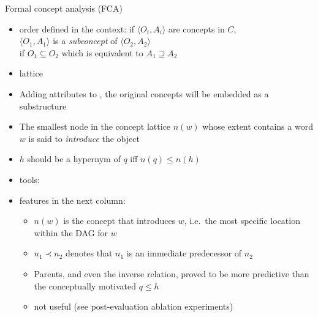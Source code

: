 \documentclass{beamer}
\newlength{\onecolwid}
\begin{document}
\begin{frame}[t]
\begin{columns}[t]
\begin{column}{\onecolwid}
\begin{block}{Formal concept analysis (FCA)}
\begin{itemize}
          \item order defined in the context:
            if $\langle O_i , A_i \rangle$ are concepts in $C$, \\
            $\langle O_1 , A_1 \rangle$ is a \emph{subconcept} of $\langle
            O_2 , A_2 \rangle$ \\
            if $O_1 \subseteq O_2 $ which is equivalent to $A_1 \supseteq A_2 $
          \item lattice
          \item Adding attributes to \at,
            the original concepts will be embedded as a substructure
          \item The smallest node in the concept lattice $n(w)$ whose extent contains a word
            $w$ is said to \emph{introduce} the object
          \item $h$ should be a hypernym of $q$ iff $n(q)\le n(h)$
          \item tools: \citet{Endres:2010,Cimiano:2005}
          \item features in the next column:%
            \begin{itemize}
              \item $n(w)$ is the concept that introduces $w$, i.e.~the most specific
                location within the DAG for $w$

              \item $n_1\prec n_2$ denotes that $n_1$ is an immediate predecessor of $n_2$
              \item Parents, and even the inverse relation, proved to be more predictive
                than the conceptually motivated  $q\le h$
              \item not useful (see post-evaluation ablation experiments)
            \end{itemize}
        \end{itemize}
      \end{block}


\end{column}
\end{columns}
\end{frame}
\end{document}

